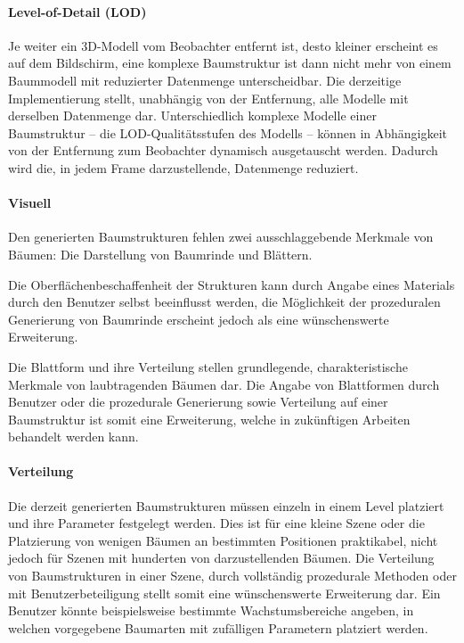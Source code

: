 \paragraph{Level-of-Detail (LOD)}

Je weiter ein 3D-Modell vom Beobachter entfernt ist, desto kleiner erscheint es auf dem Bildschirm, eine komplexe Baumstruktur ist dann nicht mehr von einem Baummodell mit reduzierter Datenmenge unterscheidbar. Die derzeitige Implementierung stellt, unabhängig von der Entfernung, alle Modelle mit derselben Datenmenge dar. Unterschiedlich komplexe Modelle einer Baumstruktur -- die LOD-Qualitätsstufen des Modells -- können in Abhängigkeit von der Entfernung zum Beobachter dynamisch ausgetauscht werden. Dadurch wird die, in jedem Frame darzustellende, Datenmenge reduziert. \cite[S.267]{Deussen:05}

\paragraph{Visuell}

Den generierten Baumstrukturen fehlen zwei ausschlaggebende Merkmale von Bäumen: Die Darstellung von Baumrinde und Blättern. 

Die Oberflächenbeschaffenheit der Strukturen kann durch Angabe eines Materials durch den Benutzer selbst beeinflusst werden, die Möglichkeit der prozeduralen Generierung von Baumrinde erscheint jedoch als eine wünschenswerte Erweiterung. 

Die Blattform und ihre Verteilung stellen grundlegende, charakteristische Merkmale von laubtragenden Bäumen dar. Die Angabe von Blattformen durch Benutzer oder die prozedurale Generierung sowie Verteilung auf einer Baumstruktur ist somit eine Erweiterung, welche in zukünftigen Arbeiten behandelt werden kann.

\paragraph{Verteilung}

Die derzeit generierten Baumstrukturen müssen einzeln in einem Level platziert und ihre Parameter festgelegt werden. Dies ist für eine kleine Szene oder die Platzierung von wenigen Bäumen an bestimmten Positionen praktikabel, nicht jedoch für Szenen mit hunderten von darzustellenden Bäumen. Die Verteilung von Baumstrukturen in einer Szene, durch vollständig prozedurale Methoden oder mit Benutzerbeteiligung stellt somit eine wünschenswerte Erweiterung dar. Ein Benutzer könnte beispielsweise bestimmte Wachstumsbereiche angeben, in welchen vorgegebene Baumarten mit zufälligen Parametern platziert werden. 
